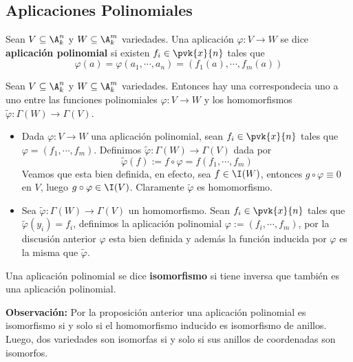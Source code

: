 \documentclass{article}
\begin{document}
\subsection{Aplicaciones Polinomiales}
\begin{dfn}
    Sean $V\subseteq\A_{k}^{n}$ y $W\subseteq\A_{k}^{m}$ variedades. Una aplicación 
    $\varphi:V\to W$ se dice \textbf{aplicación polinomial} si existen $f_{i}\in\pvk{x}{n}$ tales 
    que
    \begin{equation*}
        \varphi(a)=\varphi(a_{1},\cdots,a_{n})=(f_{1}(a),\cdots,f_{m}(a))
    \end{equation*}
\end{dfn}
\begin{prop}
    Sean $V\subseteq\A_{k}^{n}$ y $W\subseteq\A_{k}^{m}$ variedades. Entonces hay una 
    correspondecia uno a uno entre las funciones polinomiales $\varphi:V\to W$ y los homomorfismos
    $\tilde{\varphi}:\Gamma(W)\to\Gamma(V)$.
\end{prop}
\begin{dem}\hspace{1mm}
    \begin{itemize}
        \item Dada $\varphi:V\to W$ una aplicación polinomial, sean $f_{i}\in\pvk{x}{n}$ tales que
        $\varphi=(f_{1},\cdots,f_{m})$. Definimos $\tilde{\varphi}:\Gamma(W)\to\Gamma(V)$ dada por
        \begin{equation*}
            \tilde{\varphi}(f):=f\circ\varphi=f(f_{1},\cdots,f_{m})
        \end{equation*}
        Veamos que esta bien definida, en efecto, sea $f\in\I(W)$, entonces $g\circ\varphi\equiv0$ 
        en $V$, luego $g\circ\varphi\in\I(V)$. Claramente $\tilde{\varphi}$ es homomorfismo.

        \item Sea $\tilde{\varphi}:\Gamma(W)\to\Gamma(V)$ un homomorfismo. Sean 
        $f_{i}\in\pvk{x}{n}$ tales que $\tilde{\varphi}(y_{i})=f_{i}$, definimos la aplicación 
        polinomial $\varphi:=(f_{i},\cdots,f_{m})$, por la discusión anterior $\varphi$ esta bien
        definida y además la función inducida por $\varphi$ es la misma que $\tilde{\varphi}$.
    \end{itemize}
\end{dem}
\begin{dfn}
    Una aplicación polinomial se dice \textbf{isomorfismo} si tiene inversa que también es una 
    aplicación polinomial.
\end{dfn}
\noindent\textbf{Observación:} Por la proposición anterior una aplicación polinomial es 
isomorfismo si y solo si el homomorfismo inducido es isomorfismo de anillos. Luego, dos variedades
son isomorfas si y solo si sus anillos de coordenadas son isomorfos.
\end{document}
